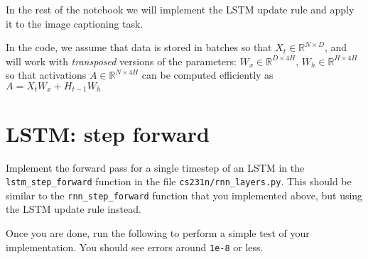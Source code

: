 \documentclass[11pt]{article}
\begin{document}
In the rest of the notebook we will implement the LSTM update rule and
apply it to the image captioning task.

In the code, we assume that data is stored in batches so that
\(X_t \in \mathbb{R}^{N\times D}\), and will work with \emph{transposed}
versions of the parameters: \(W_x \in \mathbb{R}^{D \times 4H}\),
\(W_h \in \mathbb{R}^{H\times 4H}\) so that activations
\(A \in \mathbb{R}^{N\times 4H}\) can be computed efficiently as
\(A = X_t W_x + H_{t-1} W_h\)

    \hypertarget{lstm-step-forward}{%
\section{LSTM: step forward}\label{lstm-step-forward}}

Implement the forward pass for a single timestep of an LSTM in the
\texttt{lstm\_step\_forward} function in the file
\texttt{cs231n/rnn\_layers.py}. This should be similar to the
\texttt{rnn\_step\_forward} function that you implemented above, but
using the LSTM update rule instead.

Once you are done, run the following to perform a simple test of your
implementation. You should see errors around \texttt{1e-8} or less.
\end{document}

